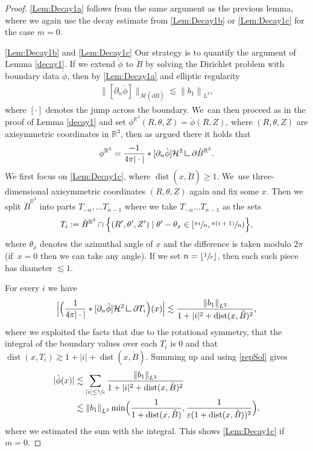 \documentclass[10pt]{amsart}
\let\epsilon\varepsilon
\theoremstyle{definition}
\DeclareMathOperator{\dist}{dist}
\newcommand\R{\mathbb{R}}
\newcommand\norm[1]{\left\lVert #1\right\rVert}
\newcommand\bnorm[1]{\bigl\lVert #1\bigr\rVert}
\newcommand\eq{=}
\newcommand{\mres}{\mathbin{\vrule height 1.6ex depth 0pt width
0.13ex\vrule height 0.13ex depth 0pt width 1.3ex}}
\let\de\partial
\let\eps\epsilon
\begin{document}
\begin{proof}
\eqref{Lem:Decay1a} follows from the same argument as the previous lemma, where we again use the decay estimate from \eqref{Lem:Decay1b} or \eqref{Lem:Decay1c} for the case $m=0$.

\eqref{Lem:Decay1b} and \eqref{Lem:Decay1c} Our strategy is to quantify the argument of Lemma \ref{decay1}.
If we extend $\grave{\phi}$ to $\grave{B}$ by solving the Dirichlet problem with boundary data $\grave{\phi}$, then by \eqref{Lem:Decay1a} and elliptic regularity
\begin{align*}
\bnorm{[\de_n\grave{\phi}]}_{\mathcal{M}(\de \grave{B})}\lesssim \norm{b_1}_{L^2},%
\end{align*}
where $[\cdot]$ denotes the jump across the boundary. We~can then proceed as in the proof of Lemma \ref{decay1} and set $\phi^{\R^3}(R,\theta,Z)=\grave{\phi}(R,Z)$, where $(R,\theta,Z)$ are axisymmetric coordinates in $\R^3$, then as argued there it holds that
\begin{align}
\phi^{\R^3}\eq\frac{-1}{4\pi|\cdot|}*[\de_n\grave{\phi}]\mathcal{H}^2\mres\de\grave{B}^{\R^3}.\label{repSol}
\end{align}
We first focus on \eqref{Lem:Decay1c}, where $\dist(x,\grave{B})\geq 1$. We~use three-dimensional axisymmetric coordinates $(R,\theta,Z)$ again and fix some $x$. Then we split $\grave{B}^{\R^3}$ into parts $T_{-n},\dots T_{n-1}$ where we take $T_{-n}\dots T_{n-1}$ as the sets
\begin{align*}
T_i:=\grave{B}^{\R^3}\cap\Bigl\{(R',\theta',Z')\mid\theta'-\theta_x\in \left[\sfrac{\pi i}{n},\sfrac{\pi(i+1)}{n}\right)\Bigr\},
\end{align*}
where $\theta_x$ denotes the azimuthal angle of $x$ and the difference is taken modulo $2\pi$ (if~$x=0$ then we can take any angle).
If we set $n=\lfloor\sfrac{1}{\eps}\rfloor$, then each such piece has diameter $\lesssim 1$.

For every $i$ we have
\begin{align*}
\Bigl|\Bigl(\frac{1}{4\pi|\cdot|}*[\de_n\grave{\phi}]\mathcal{H}^2\mres\de T_i\Bigr)(x)\Bigr|\lesssim \frac{\norm{b_1}_{L^2}}{1+|i|^2+\dist(x,\hat{B})^2},
\end{align*}
where we exploited the facts that due to the rotational symmetry, that the integral of the boundary values over each $T_i$ is $0$ and that $\dist(x,T_i)\gtrsim1+ |i|+\dist(x,\grave{B})$. Summing up and using \eqref{repSol} gives
\begin{align*}
|\grave{\phi}(x)|&\lesssim \sum_{|i|\leq\sfrac{1}{\eps}}\frac{\norm{b_1}_{L^2}}{1+|i|^2+\dist(x,\grave{B})^2}\\
&\lesssim \norm{b_1}_{L^2}\min\Bigl(\frac{1}{1+\dist(x,\grave{B})},\frac{1}{\eps(1+\dist(x,\grave{B}))^2}\Bigr),
\end{align*}
where we estimated the sum with the integral. This shows \eqref{Lem:Decay1c} if $m=0$.


\end{proof}
\end{document}
